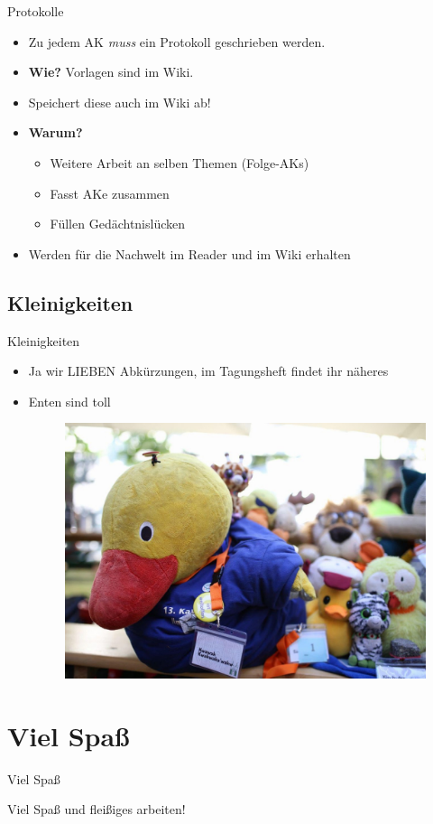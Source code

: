 \documentclass[compress,]{beamer}
\begin{document}
\begin{frame}{Protokolle}

  \begin{itemize}
  \item<1-> Zu jedem AK \emph{muss} ein Protokoll geschrieben werden.
  \item<2-> \textbf{Wie?} Vorlagen sind im Wiki.

  \item<3-> Speichert diese auch im Wiki ab!
  \item<3-> \textbf{Warum?}
    \begin{itemize}
    \item<4-> Weitere Arbeit an selben Themen (Folge-AKs)
    \item<5-> Fasst AKe zusammen
    \item<6-> Füllen Gedächtnislücken
    \end{itemize}
  \item<7-> Werden für die Nachwelt im Reader und im Wiki erhalten
  \end{itemize}

\end{frame}



\subsection{Kleinigkeiten}

\begin{frame}{Kleinigkeiten}

\begin{itemize}
	\item<1-> Ja wir LIEBEN Abkürzungen, im Tagungsheft findet ihr näheres
	\item<2-> Enten sind toll
	\begin{figure}
		\centering
		\includegraphics[scale=0.1]{Ente.pdf}
	\end{figure}
	
\end{itemize}
\end{frame}

\section{Viel Spaß}

\begin{frame}{Viel Spaß}

Viel Spaß und fleißiges arbeiten!

\end{frame}
\end{document}
